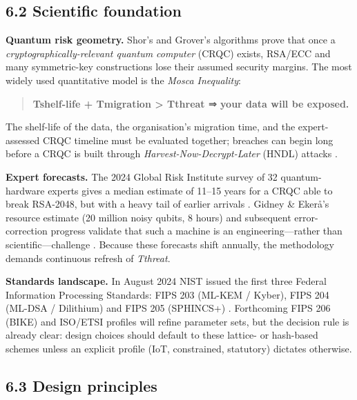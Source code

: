 \documentclass[
  english,
]{article}
\begin{document}
\subsection{6.2 Scientific foundation}\label{scientific-foundation}

\textbf{Quantum risk geometry.} Shor's and Grover's algorithms prove
that once a \emph{cryptographically-relevant quantum computer} (CRQC)
exists, RSA/ECC and many symmetric-key constructions lose their assumed
security margins. The most widely used quantitative model is the
\emph{Mosca Inequality}:

\begin{quote}
\textbf{T­­shelf-life + T­­migration \textgreater{} T­­threat ⇒ your data will
be exposed.}
\end{quote}

The shelf-life of the data, the organisation's migration time, and the
expert-assessed CRQC timeline must be evaluated together; breaches can
begin long before a CRQC is built through
\emph{Harvest-Now-Decrypt-Later} (HNDL) attacks .

\textbf{Expert forecasts.} The 2024 Global Risk Institute survey of 32
quantum-hardware experts gives a median estimate of 11--15 years for a
CRQC able to break RSA-2048, but with a heavy tail of earlier arrivals .
Gidney \& Ekerå's resource estimate (20 million noisy qubits, 8 hours)
and subsequent error-correction progress validate that such a machine is
an engineering---rather than scientific---challenge . Because these
forecasts shift annually, the methodology demands continuous refresh of
\emph{T­­threat}.

\textbf{Standards landscape.} In August 2024 NIST issued the first three
Federal Information Processing Standards: FIPS 203 (ML-KEM / Kyber),
FIPS 204 (ML-DSA / Dilithium) and FIPS 205 (SPHINCS+) . Forthcoming FIPS
206 (BIKE) and ISO/ETSI profiles will refine parameter sets, but the
decision rule is already clear: design choices should default to these
lattice- or hash-based schemes unless an explicit profile (IoT,
constrained, statutory) dictates otherwise.

\subsection{6.3 Design principles}\label{design-principles}
\end{document}
